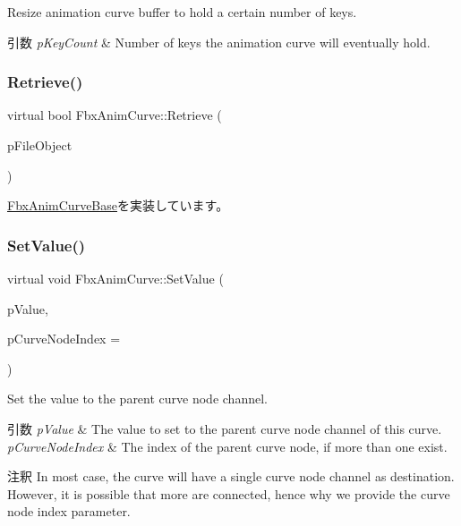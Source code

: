 Resize animation curve buffer to hold a certain number of keys. 
\begin{DoxyParams}{引数}
{\em p\+Key\+Count} & Number of keys the animation curve will eventually hold. \\
\hline
\end{DoxyParams}
\mbox{\label{class_fbx_anim_curve_a17087752d3a28d373b2aaa66d1755f62}} 
\subsubsection{\texorpdfstring{Retrieve()}{Retrieve()}}
{\footnotesize\ttfamily virtual bool Fbx\+Anim\+Curve\+::\+Retrieve (\begin{DoxyParamCaption}\item[{\hyperlink{class_fbx_i_o}{Fbx\+IO} $\ast$}]{p\+File\+Object }\end{DoxyParamCaption})\hspace{0.3cm}{\ttfamily [pure virtual]}}



\hyperlink{class_fbx_anim_curve_base_a58ba1ce28a08145795d95bb27e2db02f}{Fbx\+Anim\+Curve\+Base}を実装しています。

\mbox{\label{class_fbx_anim_curve_abcb5d65afda70282d312be4f58b7d9cd}} 
\subsubsection{\texorpdfstring{Set\+Value()}{SetValue()}}
{\footnotesize\ttfamily virtual void Fbx\+Anim\+Curve\+::\+Set\+Value (\begin{DoxyParamCaption}\item[{float}]{p\+Value,  }\item[{int}]{p\+Curve\+Node\+Index = {} }\end{DoxyParamCaption})\hspace{0.3cm}{\ttfamily [pure virtual]}}

Set the value to the parent curve node channel. 
\begin{DoxyParams}{引数}
{\em p\+Value} & The value to set to the parent curve node channel of this curve. \\
\hline
{\em p\+Curve\+Node\+Index} & The index of the parent curve node, if more than one exist. \\
\hline
\end{DoxyParams}
\begin{DoxyRemark}{注釈}
In most case, the curve will have a single curve node channel as destination. However, it is possible that more are connected, hence why we provide the curve node index parameter. 
\end{DoxyRemark}
\mbox{\label{class_fbx_anim_curve_a0ef3229e43aaca33ab50161235541060}} 

